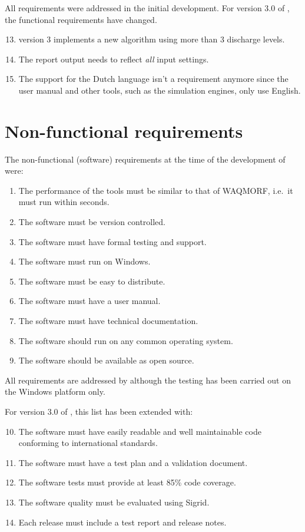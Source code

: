 All requirements were addressed in the initial development.
For version 3.0 of \dfastmi, the functional requirements have changed.

\begin{enumerate}
\setcounter{enumi}{12} %
\item \dfastmi version 3 implements a new algorithm using more than 3 discharge levels.
\item The report output needs to reflect \emph{all} input settings.
\item The support for the Dutch language isn't a requirement anymore since the user manual and other tools, such as the simulation engines, only use English.
\end{enumerate}


\section{Non-functional requirements}

The non-functional (software) requirements at the time of the development of  were:

\begin{enumerate}
\item The performance of the tools must be similar to that of WAQMORF, i.e.~it must run within seconds.
\item The software must be version controlled.
\item The software must have formal testing and support.
\item The software must run on Windows.
\item The software must be easy to distribute.
\item The software must have a user manual.
\item The software must have technical documentation.

\item The software should run on any common operating system.
\item The software should be available as open source.
\end{enumerate}

All requirements are addressed by \dfastmi although the testing has been carried out on the Windows platform only.

For version 3.0 of \dfastmi, this list has been extended with:

\begin{enumerate}
\setcounter{enumi}{9} %
\item The software must have easily readable and well maintainable code conforming to international standards.
\item The software must have a test plan and a validation document.
\item The software tests must provide at least 85\% code coverage.
\item The software quality must be evaluated using Sigrid.
\item Each release must include a test report and release notes.
\end{enumerate}

